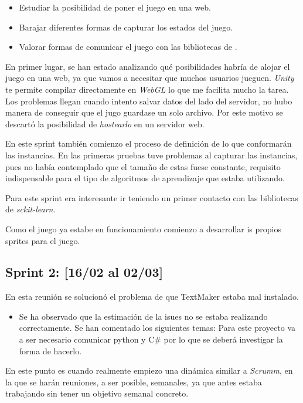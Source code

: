 \begin{itemize}
     \item Estudiar la posibilidad de poner el juego en una web. 
     \item Barajar diferentes formas de capturar los estados del juego. \item Valorar formas de comunicar el juego con las bibliotecas de .
\end{itemize}

En primer lugar, se han estado analizando qué posibilidades habría de alojar el juego en una web, ya que vamos a necesitar que muchos usuarios jueguen. \emph{Unity} te permite compilar directamente en \emph{WebGL} lo que me facilita mucho la tarea. Los problemas llegan cuando intento salvar datos del lado del servidor, no hubo manera de conseguir que el jugo guardase un solo archivo. Por este motivo se descartó la posibilidad de \emph{hostearlo} en un servidor web.

En este sprint también comienzo el proceso de definición de lo que conformarán las instancias. En las primeras pruebas tuve problemas al capturar las instancias, pues no había contemplado que el tamaño de estas fuese constante, requisito indispensable para el tipo de algoritmos de aprendizaje que estaba utilizando.

Para este sprint era interesante ir teniendo un primer contacto con las bibliotecas de \emph{sckit-learn}.

Como el juego ya estabe en funcionamiento comienzo a desarrollar is propios sprites para el juego.


\subsection{Sprint 2: [16/02 al 02/03]}

 En esta reunión se solucionó el problema de que TextMaker estaba mal instalado.
\begin{itemize}
    \item Se ha observado que la estimación de la isues no se estaba realizando correctamente.
    Se han comentado los siguientes temas: Para este proyecto va a ser necesario comunicar python y C\# por lo que se deberá investigar la forma de hacerlo.
\end{itemize}

En este punto es cuando realmente empiezo una dinámica similar a \emph{Scrumm}, en la que se harán reuniones, a ser posible, semanales, ya que antes estaba trabajando sin tener un objetivo semanal concreto.


